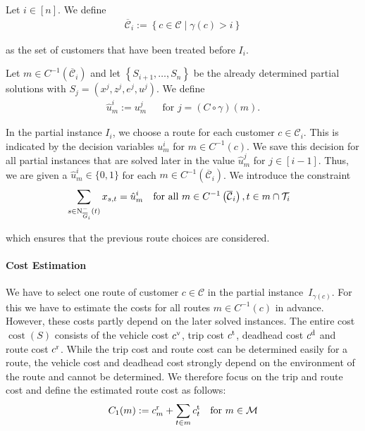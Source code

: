 \begin{definition}
\label{def:route_fix}

Let ${i\in[n]}$. We define
\begin{align*}
	\overline{\mathcal{C}}_i := \left\{c\in\mathcal{C}\mid \gamma\left(c\right)>i\right\}
\end{align*}

as the set of customers that have been treated before $I_i$.

Let ${m\in C^{-1}\left(\overline{\mathcal{C}}_i\right)}$ and let $\left\{S_{i+1},\dots,S_n\right\}$ be the already determined partial solutions with ${S_j=\left(x^j,z^j,e^j,u^j\right)}$. We define
\begin{align*}
	\hat{u}^i_m := u^j_m && \text{for } j=\left(C\circ\gamma\right)(m).
\end{align*}

\end{definition}

In the partial instance $I_i$, we choose a route for each customer $c\in\mathcal{C}_i$. This is indicated by the decision variables $u^i_m$ for ${m\in C^{-1}(c)}$. We save this decision for all partial instances that are solved later in the value $\hat{u}^j_m$ for ${j\in[i-1]}$. Thus, we are given a ${\hat{u}^i_m\in\{0,1\}}$ for each ${m\in C^{-1}\left(\overline{\mathcal{C}}_i\right)}$. We introduce the constraint
\begin{align}
	&\sum_{s\in\operatorname{N}_{\overline{G}_i}^-(t)} x_{s,t} = \hat{u}^i_m && \text{for all } m\in C^{-1}\left(\overline{\mathcal{C}}_i\right), t\in m\cap\mathcal{T}_i \label{eq:TMILP:route_fix}
\end{align}

which ensures that the previous route choices are considered.

\paragraph{Cost Estimation} \parfill

We have to select one route of customer ${c\in\mathcal{C}}$ in the partial instance~$I_{\gamma(c)}$. For this we have to estimate the costs for all routes $m\in C^{-1}(c)$ in advance. However, these costs partly depend on the later solved instances. The entire cost $\operatorname{cost}(S)$ consists of the vehicle cost $c^{\operatorname{v}}$, trip cost $c^{\operatorname{t}}$, deadhead cost $c^{\operatorname{d}}$ and route cost $c^{\operatorname{r}}$. While the trip cost and route cost can be determined easily for a route, the vehicle cost and deadhead cost strongly depend on the environment of the route and cannot be determined. We therefore focus on the trip and route cost and define the estimated route cost as follows:
\begin{align*}
	C_1(m) := c^{\operatorname{r}}_m + \sum_{t\in m}c^{\operatorname{t}}_t && \text{for } m\in\mathcal{M}
\end{align*}

